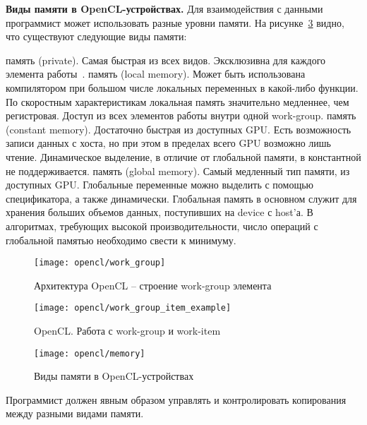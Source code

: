 \textbf{Виды памяти в OpenCL-устройствах.} Для взаимодействия с данными программист может использовать разные уровни памяти. На рисунке~\ref{OpenCLMemory:image} видно, что существуют следующие виды памяти:

\begin{itemize}
     память (private). Самая быстрая из всех видов. Эксклюзивна для каждого элемента работы~\cite{Bastrakov2011}.
     память (local memory). Может быть использована компилятором при большом числе локальных переменных в какой-либо функции. По скоростным характеристикам локальная память значительно медленнее, чем регистровая. Доступ из всех элементов работы внутри одной work-group.
     память (constant memory). Достаточно быстрая из доступных GPU. Есть возможность записи данных с хоста, но при этом в пределах всего GPU возможно лишь чтение. Динамическое выделение, в отличие от глобальной памяти, в константной не поддерживается.
     память (global memory). Самый медленный тип памяти, из доступных GPU. Глобальные переменные можно выделить с помощью спецификатора, а также динамически. Глобальная память в основном служит для хранения больших объемов данных, поступивших на device с host’а. В алгоритмах, требующих высокой производительности, число операций с глобальной памятью необходимо свести к минимуму.
\end{itemize}	

\begin{figure}
    \texttt{[image: opencl/work\_group]}
    \caption{Архитектура OpenCL -- строение work-group элемента}
    \label{OpenCLWorkGroup:image}
\end{figure}

\begin{figure}[H]
    \texttt{[image: opencl/work\_group\_item\_example]}
    \caption{OpenCL. Работа с work-group и work-item}
    \label{OpenCLWorkGroupItemExample:image}
\end{figure}

\begin{figure}[H]
    \texttt{[image: opencl/memory]}
    \caption{Виды памяти в OpenCL-устройствах}
    \label{OpenCLMemory:image}
\end{figure}

Программист должен явным образом управлять и контролировать копирования между разными видами памяти.

